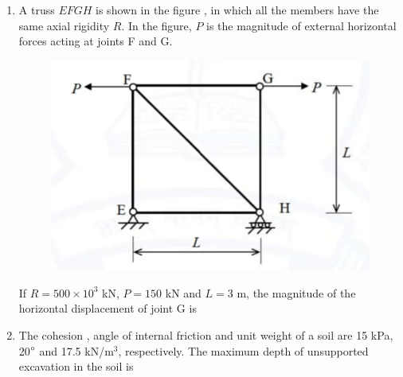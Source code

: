\documentclass[journal,12pt,onecolumn]{article}
\theoremstyle{remark}
\begin{document}
\begin{enumerate}
\hfill{}

\item A truss $EFGH$ is shown in the figure , in which all the members have the same axial rigidity $R$. In the figure, $P$ is the magnitude of external horizontal forces acting at joints F and G.
\begin{figure}[H]
    \centering
    \includegraphics[width=0.7\columnwidth]{figs/1q22.jpg}
    \caption{}
    \label{fig:q22}
\end{figure}
If $R = 500 \times 10^3$ kN, $P = 150$ kN and $L = 3$ m, the magnitude of the horizontal displacement of joint G  is \underline{\hspace{2cm}}

\hfill{}

\item The cohesion , angle of internal friction \brak{\phi} and unit weight \brak{\gamma} of a soil are 15 kPa, 20$\degree$ and 17.5 kN/m$^3$, respectively. The maximum depth of unsupported excavation in the soil  is \underline{\hspace{2cm}}

\hfill{}


\end{enumerate}
\end{document}

